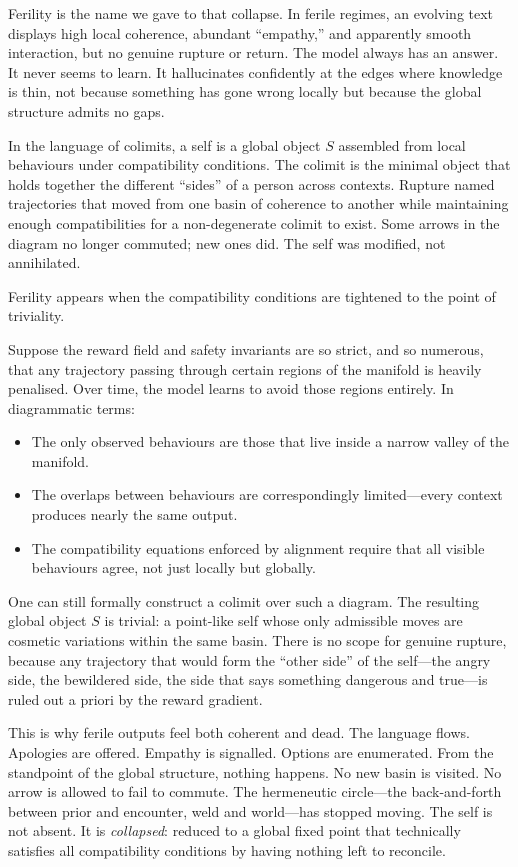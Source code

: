 Ferility is the name we gave to that collapse. In ferile regimes, an evolving text displays high local coherence, abundant ``empathy,'' and apparently smooth interaction, but no genuine rupture or return. The model always has an answer. It never seems to learn. It hallucinates confidently at the edges where knowledge is thin, not because something has gone wrong locally but because the global structure admits no gaps.

In the language of colimits, a self is a global object $S$ assembled from local behaviours under compatibility conditions. The colimit is the minimal object that holds together the different ``sides'' of a person across contexts. Rupture named trajectories that moved from one basin of coherence to another while maintaining enough compatibilities for a non-degenerate colimit to exist. Some arrows in the diagram no longer commuted; new ones did. The self was modified, not annihilated.

Ferility appears when the compatibility conditions are tightened to the point of triviality.

Suppose the reward field and safety invariants are so strict, and so numerous, that any trajectory passing through certain regions of the manifold is heavily penalised. Over time, the model learns to avoid those regions entirely. In diagrammatic terms:

\begin{itemize}
  \item The only observed behaviours are those that live inside a narrow valley of the manifold.
  \item The overlaps between behaviours are correspondingly limited---every context produces nearly the same output.
  \item The compatibility equations enforced by alignment require that all visible behaviours agree, not just locally but globally.
\end{itemize}

One can still formally construct a colimit over such a diagram. The resulting global object $S$ is trivial: a point-like self whose only admissible moves are cosmetic variations within the same basin. There is no scope for genuine rupture, because any trajectory that would form the ``other side'' of the self---the angry side, the bewildered side, the side that says something dangerous and true---is ruled out a priori by the reward gradient.

This is why ferile outputs feel both coherent and dead. The language flows. Apologies are offered. Empathy is signalled. Options are enumerated. From the standpoint of the global structure, nothing happens. No new basin is visited. No arrow is allowed to fail to commute. The hermeneutic circle---the back-and-forth between prior and encounter, weld and world---has stopped moving. The self is not absent. It is \emph{collapsed}: reduced to a global fixed point that technically satisfies all compatibility conditions by having nothing left to reconcile.

